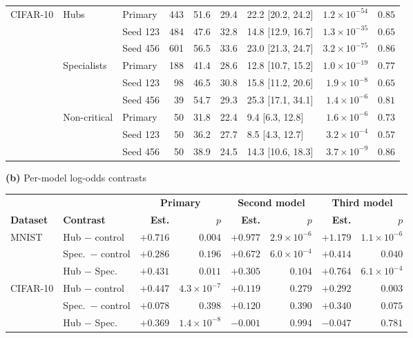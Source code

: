\begin{table}[!htbp]
\begin{tabular}{@{}lllrrrlrr@{}}
        \midrule
        CIFAR-10 & \multirow{3}{*}{Hubs} & Primary & 443 & 51.6 & 29.4 & 22.2 [20.2, 24.2] & $1.2\times10^{-54}$ & $0.85$ \\
         &  & Seed 123 & 484 & 47.6 & 32.8 & 14.8 [12.9, 16.7] & $1.3\times10^{-35}$ & $0.65$ \\
         &  & Seed 456 & 601 & 56.5 & 33.6 & 23.0 [21.3, 24.7] & $3.2\times10^{-75}$ & $0.86$ \\
         & \multirow{3}{*}{Specialists} & Primary & 188 & 41.4 & 28.6 & 12.8 [10.7, 15.2] & $1.0\times10^{-19}$ & $0.77$ \\
         &  & Seed 123 & 98 & 46.5 & 30.8 & 15.8 [11.2, 20.6] & $1.9\times10^{-8}$ & $0.65$ \\
         &  & Seed 456 & 39 & 54.7 & 29.3 & 25.3 [17.1, 34.1] & $1.4\times10^{-6}$ & $0.81$ \\
         & \multirow{3}{*}{Non-critical} & Primary & 50 & 31.8 & 22.4 & 9.4 [6.3, 12.8] & $1.6\times10^{-6}$ & $0.73$ \\
         &  & Seed 123 & 50 & 36.2 & 27.7 & 8.5 [4.3, 12.7] & $3.2\times10^{-4}$ & $0.57$ \\
         &  & Seed 456 & 50 & 38.9 & 24.5 & 14.3 [10.6, 18.3] & $3.7\times10^{-9}$ & $0.86$ \\
        \bottomrule
    \end{tabular}

    \medskip
    \textbf{(b)} Per-model log-odds contrasts\\[2pt]
    \begin{tabular}{@{}llrrrrrr@{}}
        \toprule
        & & \multicolumn{2}{c}{\textbf{Primary}} & \multicolumn{2}{c}{\textbf{Second model}} & \multicolumn{2}{c}{\textbf{Third model}} \\
        \cmidrule(lr){3-4}\cmidrule(lr){5-6}\cmidrule(lr){7-8}
        \textbf{Dataset} & \textbf{Contrast} & \textbf{Est.} & \textbf{$p$} & \textbf{Est.} & \textbf{$p$} & \textbf{Est.} & \textbf{$p$} \\
        \midrule
        \multirow{3}{*}{MNIST} & Hub $-$ control & $+0.716$ & $0.004$ & $+0.977$ & $2.9\times10^{-6}$ & $+1.179$ & $1.1\times10^{-6}$ \\
         & Spec.\ $-$ control & $+0.286$ & $0.196$ & $+0.672$ & $6.0\times10^{-4}$ & $+0.414$ & $0.040$ \\
         & Hub $-$ Spec. & $+0.431$ & $0.011$ & $+0.305$ & $0.104$ & $+0.764$ & $6.1\times10^{-4}$ \\
        \midrule
        \multirow{3}{*}{CIFAR-10} & Hub $-$ control & $+0.447$ & $4.3\times10^{-7}$ & $+0.119$ & $0.279$ & $+0.292$ & $0.003$ \\
         & Spec.\ $-$ control & $+0.078$ & $0.398$ & $+0.120$ & $0.390$ & $+0.340$ & $0.075$ \\
         & Hub $-$ Spec. & $+0.369$ & $1.4\times10^{-8}$ & $-0.001$ & $0.994$ & $-0.047$ & $0.781$ \\
        \bottomrule
    \end{tabular}
\end{table}

